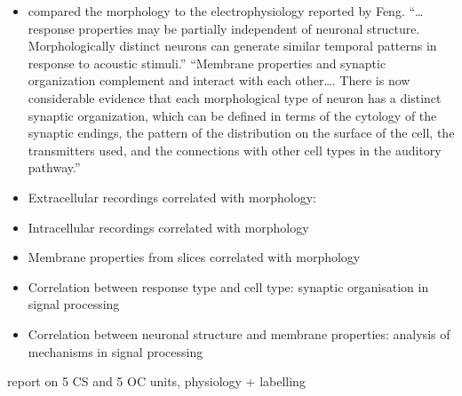 \documentclass[10pt,a4paper]{article}
\begin{document}
\begin{itemize}
\item compared the morphology to the electrophysiology reported by Feng.
  {\textquotedblleft}{\dots} response properties may be partially independent of
  neuronal structure. Morphologically distinct neurons can generate similar
  temporal patterns in response to acoustic stimuli.{\textquotedblright}
  {\textquotedblleft}Membrane properties and synaptic organization complement
  and interact with each other{\dots}. There is now considerable evidence that
  each morphological type of neuron has a distinct synaptic organization, which
  can be defined in terms of the cytology of the synaptic endings, the pattern
  of the distribution on the surface of the cell, the transmitters used, and the
  connections with other cell types in the auditory pathway.{\textquotedblright}
\item Extracellular recordings correlated with
  morphology:\citep{Bourk:1976,BourkMielcarzEtAl:1981,BrawerMorest:1975,BrawerMorestEtAl:1974,CantMorest:1984,GodfreyKiangEtAl:1975,Kane:1973,OstapoffMorestEtAl:1994,RitzBrownell:1982,TolbertMorest:1982a,
    TolbertMorest:1982b,WinterPalmer:1990,YoungRobertEtAl:1988}
\item Intracellular recordings correlated with morphology
  \citep{RhodeOertelEtAl1983,RhodeSmithEtAl:1983,RhodeGreenberg:1992,RoullierRyugo:1984,SmithRhode:1987,SmithRhode:1985,SmithRhode:1989}
\item Membrane properties from slices correlated with morphology
  \citep{HirschOertel:1988,HirschOertel:1988a,ManisMarx:1991,Oertel:1983,OertelWu:1989,OertelWuEtAl:1990,WuOertel:1984}
\item Correlation between response type and cell type: synaptic organisation in
  signal processing
\item Correlation between neuronal structure and membrane properties: analysis
  of mechanisms in signal processing
\end{itemize}
\citep{SmithRhode:1989} report on 5 CS and 5 OC units, physiology + labelling
\end{document}
